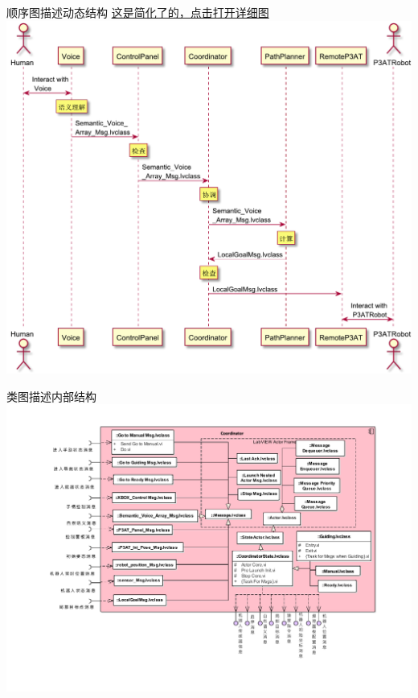 \documentclass{beamer}
\begin{document}
\begin{frame}[t]{顺序图描述动态结构}
    \href{./resource/files/sequence.pdf}{这是简化了的，点击打开详细图}
    \includegraphics[scale=0.38]{./resource/graph/6.pdf}
\end{frame}
\begin{frame}[t]{类图描述内部结构}
    \includegraphics[scale=0.42]{./resource/graph/8.pdf}
\end{frame}
\end{document}
